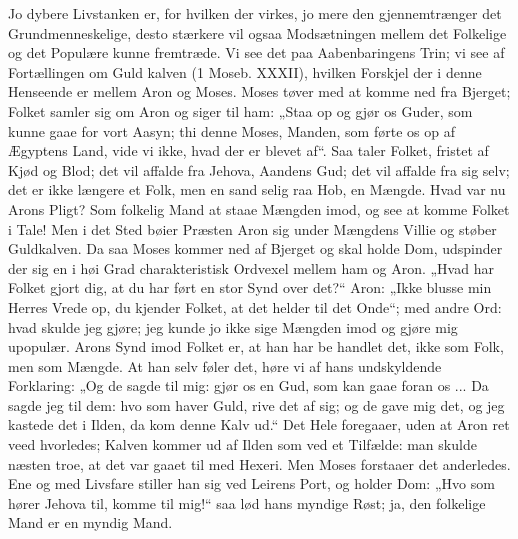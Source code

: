 \documentclass[12pt]{book}
\newcommand{\opage}[1]{\marginnote{\footnotesize\textit{[#1]}}}
\begin{document}
Jo dybere Livstanken er, for hvilken der virkes, jo
mere den gjennemtrænger det Grundmenneskelige, desto
stærkere vil ogsaa Modsætningen mellem det Folkelige
og det Populære kunne fremtræde. Vi see det paa
Aabenbaringens Trin; vi see af Fortællingen om Guld\-%
kalven (1 Moseb. XXXII), hvilken Forskjel der i denne
Henseende er mellem Aron og Moses. Moses tøver med
at komme ned fra Bjerget; Folket samler sig om Aron
og siger til ham: „Staa op og gjør os Guder, som kunne
gaae for vort Aasyn; thi denne Moses, Manden, som
førte os op af Ægyptens Land, vide vi ikke, hvad der
er blevet af“. Saa taler Folket, fristet af Kjød og Blod;
det vil affalde fra Jehova, Aandens Gud; det vil affalde
fra sig selv; det er ikke længere et Folk, men en sand\-%
selig raa Hob, en Mængde. Hvad var nu Arons Pligt?
Som folkelig Mand at staae Mængden imod, og see at
komme Folket i Tale! Men i det Sted bøier Præsten
Aron sig under Mængdens Villie og støber Guldkalven.
Da saa Moses kommer ned af Bjerget og skal holde Dom,
udspinder der sig en i høi Grad charakteristisk Ordvexel
mellem ham og Aron. „Hvad har Folket gjort dig, at
du har ført en stor Synd over det?“ Aron: „Ikke blusse
\opage{133}\setcounter{footnote}{0}%
min Herres Vrede op, du kjender Folket, at det helder
til det Onde“; med andre Ord: hvad skulde jeg gjøre;
jeg kunde jo ikke sige Mængden imod og gjøre mig
upopulær. Arons Synd imod Folket er, at han har be\-%
handlet det, ikke som Folk, men som Mængde. At han
selv føler det, høre vi af hans undskyldende Forklaring:
„Og de sagde til mig: gjør os en Gud, som kan gaae
foran os ... Da sagde jeg til dem: hvo som haver Guld,
rive det af sig; og de gave mig det, og jeg kastede det
i Ilden, da kom denne Kalv ud.“ Det Hele foregaaer,
uden at Aron ret veed hvorledes; Kalven kommer ud
af Ilden som ved et Tilfælde: man skulde næsten troe,
at det var gaaet til med Hexeri. Men Moses forstaaer
det anderledes. Ene og med Livsfare stiller han sig ved
Leirens Port, og holder Dom: „Hvo som hører Jehova
til, komme til mig!“ saa lød hans myndige Røst; ja,
den folkelige Mand er en myndig Mand.
\end{document}
